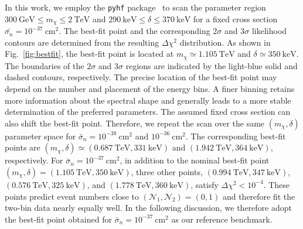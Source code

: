 \documentclass[aps,twocolumn,prl,showpacs,showkeys,preprintnumbers,superscriptaddress,nobibnotes,floatfix,nofootinbib]{revtex4-2}
\begin{document}
In this work, we employ the \texttt{pyhf} package~\cite{pyhf,pyhf_joss} to scan the parameter region $300~\mathrm{GeV}\leq m_\chi\leq2~\mathrm{TeV}$ and $290~\mathrm{keV}\leq\delta\leq370~\mathrm{keV}$ for a fixed cross section $\bar{\sigma_n}=10^{-37}~\mathrm{cm}^2$. The best-fit point and the corresponding $2\sigma$ and $3\sigma$ likelihood contours are determined from the resulting $\Delta\chi^2$ distribution. As shown in Fig.~\ref{fig:bestfit}, the best-fit point is located at $m_\chi\simeq1.105~\mathrm{TeV}$ and $\delta\simeq350~\mathrm{keV}$. The boundaries of the $2\sigma$ and $3\sigma$ regions are indicated by the light-blue solid and dashed contours, respectively. The precise location of the best-fit point may depend on the number and placement of the energy bins. A finer binning retains more information about the spectral shape and generally leads to a more stable determination of the preferred parameters. The assumed fixed cross section can also shift the best-fit point. Therefore, we repeat the scan over the same $(m_\chi,\delta)$ parameter space for $\bar{\sigma}_n=10^{-38}~\mathrm{cm}^2$ and $10^{-36}~\mathrm{cm}^2$. The corresponding best-fit points are $(m_\chi,\delta)\simeq(0.687~\mathrm{TeV},331~\mathrm{keV})$ and $(1.942~\mathrm{TeV},364~\mathrm{keV})$, respectively. For $\bar{\sigma}_n=10^{-37}~\mathrm{cm^2}$, in addition to the nominal best-fit point $(m_\chi,\delta)=(1.105~\mathrm{TeV},350~\mathrm{keV})$, three other points, $(0.994~\mathrm{TeV},347~\mathrm{keV})$, $(0.576~\mathrm{TeV},325~\mathrm{keV})$, and $(1.778~\mathrm{TeV},360~\mathrm{keV})$, satisfy $\Delta\chi^2<10^{-4}$. These points predict event numbers close to $(\mathcal{N}_{\mathrm{1}},\mathcal{N}_{\mathrm{2}})=(0,1)$ and therefore fit the two-bin data nearly equally well. In the following discussion, we therefore adopt the best-fit point obtained for $\bar{\sigma}_n=10^{-37}~\mathrm{cm}^2$ as our reference benchmark.
\end{document}
